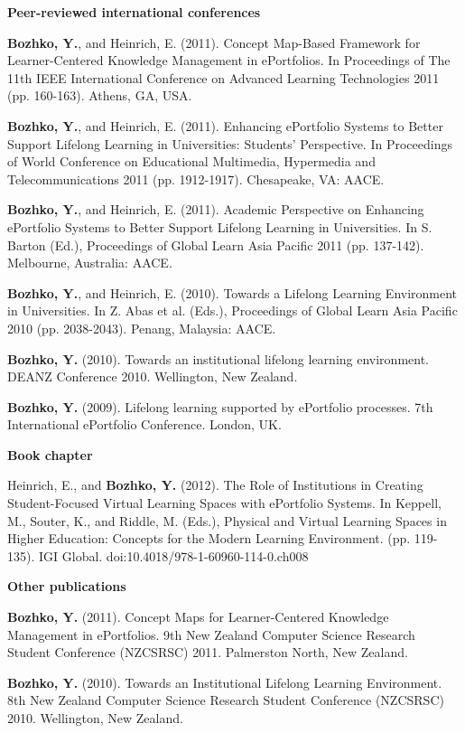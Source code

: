 \LARGE \textbf{Peer-reviewed international conferences}

\normalsize
\textbf{Bozhko, Y.}, and Heinrich, E. (2011). Concept Map-Based Framework for
Learner-Centered Knowledge Management in ePortfolios. In Proceedings of
The 11th IEEE International Conference on Advanced Learning Technologies 2011
(pp. 160-163). Athens, GA, USA.

\textbf{Bozhko, Y.}, and Heinrich, E. (2011). Enhancing ePortfolio Systems to
Better Support Lifelong Learning in Universities: Students' Perspective. In
Proceedings of World Conference on Educational Multimedia, Hypermedia and
Telecommunications 2011 (pp. 1912-1917). Chesapeake, VA: AACE.

\textbf{Bozhko, Y.}, and Heinrich, E. (2011). Academic Perspective on Enhancing
ePortfolio Systems to Better Support Lifelong Learning in Universities. In S.
Barton (Ed.), Proceedings of Global Learn Asia Pacific 2011 (pp. 137-142).
Melbourne, Australia: AACE.

﻿\textbf{Bozhko, Y.}, and Heinrich, E. (2010). Towards a Lifelong Learning
Environment in Universities. In Z. Abas et al. (Eds.), Proceedings of Global
Learn Asia Pacific 2010 (pp. 2038-2043). Penang, Malaysia: AACE. 

\textbf{Bozhko, Y.} (2010). Towards an institutional lifelong learning
environment. DEANZ Conference 2010. Wellington, New Zealand.

\textbf{Bozhko, Y.} (2009). Lifelong learning supported by ePortfolio processes.
7th International ePortfolio Conference. London, UK.

\LARGE \textbf{Book chapter}

\normalsize
Heinrich, E., and \textbf{Bozhko, Y.} (2012). The Role of Institutions in Creating
Student-Focused Virtual Learning Spaces with ePortfolio Systems. In Keppell, M.,
Souter, K., and Riddle, M. (Eds.), Physical and Virtual Learning Spaces in
Higher Education: Concepts for the Modern Learning Environment. (pp. 119-135). 
IGI Global. doi:10.4018/978-1-60960-114-0.ch008

\LARGE \textbf{Other publications}

\normalsize
\textbf{Bozhko, Y.} (2011). Concept Maps for Learner-Centered Knowledge
Management in ePortfolios. 9th New Zealand Computer Science Research Student Conference
(NZCSRSC) 2011. Palmerston North, New Zealand.

\textbf{Bozhko, Y.} (2010). Towards an Institutional Lifelong Learning
Environment. 8th New Zealand Computer Science Research Student Conference (NZCSRSC) 2010.
Wellington, New Zealand.




